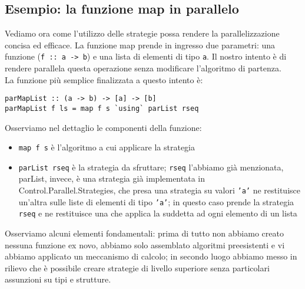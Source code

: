 \subsection{Esempio: la funzione map in parallelo}
Vediamo ora come l'utilizzo delle strategie possa rendere la parallelizzazione concisa ed efficace. La funzione map prende in ingresso due parametri: una funzione (\texttt{f :: a -> b}) e una lista di elementi di tipo \texttt{a}. Il nostro intento è di rendere parallela questa operazione senza modificare l'algoritmo di partenza.\\
La funzione più semplice finalizzata a questo intento è:
\begin{verbatim}
parMapList :: (a -> b) -> [a] -> [b]
parMapList f ls = map f s `using` parList rseq
\end{verbatim}
Osserviamo nel dettaglio le componenti della funzione:
\begin{itemize}
\item{\texttt{map f s} è l'algoritmo a cui applicare la strategia}
\item{\texttt{parList rseq} è la strategia da sfruttare; \texttt{rseq} l'abbiamo già menzionata, parList, invece, è una strategia già implementata in Control.Parallel.Strategies, che presa una strategia su valori \texttt{'a'} ne restituisce un'altra sulle liste di elementi di tipo \texttt{'a'}; in questo caso prende la strategia \texttt{rseq} e ne restituisce una che applica la suddetta ad ogni elemento di un lista}
\end{itemize}
Osserviamo alcuni elementi fondamentali: prima di tutto non abbiamo creato nessuna funzione ex novo, abbiamo solo assemblato algoritmi preesistenti e vi abbiamo applicato un meccanismo di calcolo; in secondo luogo abbiamo messo in rilievo che è possibile creare strategie di livello superiore senza particolari assunzioni su tipi e strutture. 
